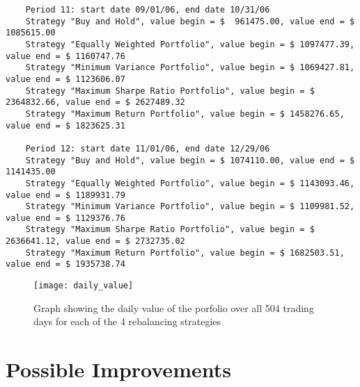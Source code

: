 \documentclass[english]{scrartcl}
\begin{document}
\begin{verbatim}
	Period 11: start date 09/01/06, end date 10/31/06
	Strategy "Buy and Hold", value begin = $  961475.00, value end = $ 1085615.00
	Strategy "Equally Weighted Portfolio", value begin = $ 1097477.39, value end = $ 1160747.76
	Strategy "Minimum Variance Portfolio", value begin = $ 1069427.81, value end = $ 1123606.07
	Strategy "Maximum Sharpe Ratio Portfolio", value begin = $ 2364832.66, value end = $ 2627489.32
	Strategy "Maximum Return Portfolio", value begin = $ 1458276.65, value end = $ 1823625.31
	
	Period 12: start date 11/01/06, end date 12/29/06
	Strategy "Buy and Hold", value begin = $ 1074110.00, value end = $ 1141435.00
	Strategy "Equally Weighted Portfolio", value begin = $ 1143093.46, value end = $ 1189931.79
	Strategy "Minimum Variance Portfolio", value begin = $ 1109981.52, value end = $ 1129376.76
	Strategy "Maximum Sharpe Ratio Portfolio", value begin = $ 2636641.12, value end = $ 2732735.02
	Strategy "Maximum Return Portfolio", value begin = $ 1682503.51, value end = $ 1935738.74
	\end{verbatim}
	
	\begin{figure}[!htb]
		\begin{center}
			\texttt{[image: daily\_value]}
			
		\end{center}
		\caption{Graph showing the daily value of the porfolio over all 504 trading days for each of the 4 rebalancing strategies}
		\vspace{-10pt}
	\end{figure}
	
	\section{Possible Improvements}
	
	
	
	
	
\end{document}

